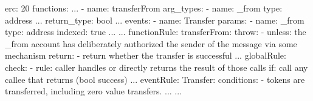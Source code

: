 erc: 20
functions:
  ...
  - name: transferFrom
    arg_types: 
      - name: _from
        type: address
      ...
    return_type: bool
  ...
events:
  - name: Transfer
    params:
      - name: _from
        type: address
        indexed: true
      ...
  ...
functionRule:
  transferFrom:
    throw:
      - unless: the _from account has deliberately authorized the sender of the message via some mechanism
    return:
      - return whether the transfer is successful
    ...
globalRule:
  check:
    - rule: caller handles or directly returns the result of those calls
      if: call any callee that returns (bool success)
  ...
eventRule:
  Transfer:
    conditions:
      - tokens are transferred, including zero value transfers.
      ...
  ...